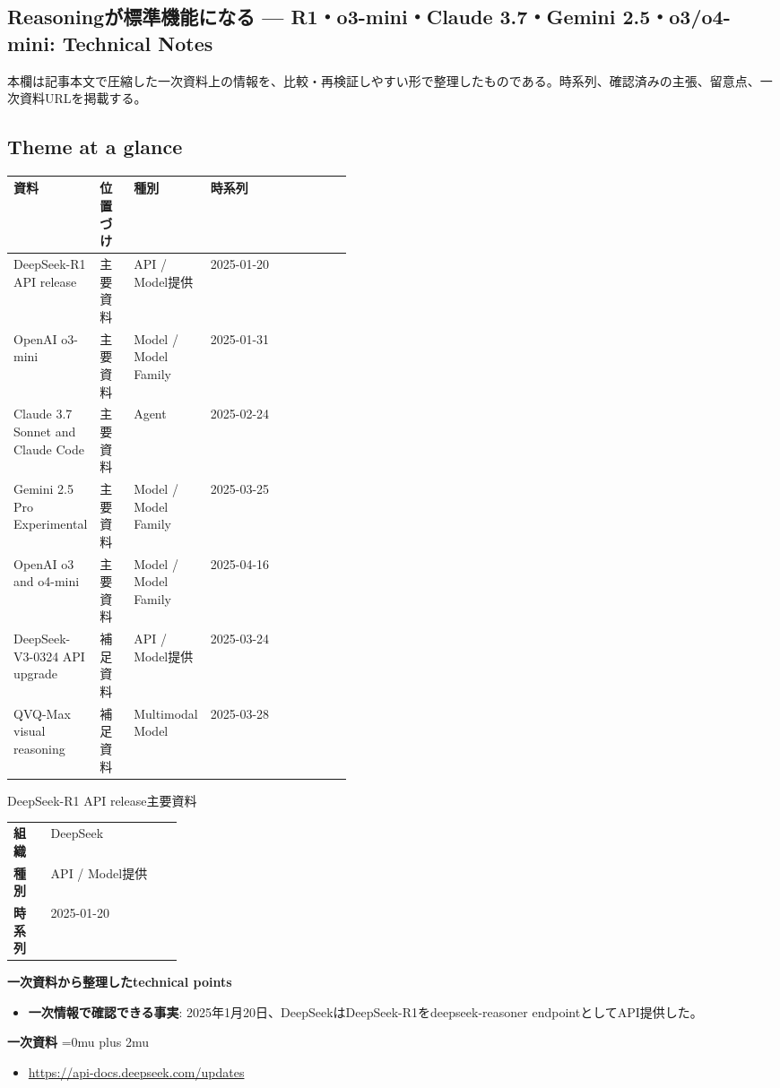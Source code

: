 \subsection*{Reasoningが標準機能になる — R1・o3-mini・Claude 3.7・Gemini 2.5・o3/o4-mini: Technical Notes}
本欄は記事本文で圧縮した一次資料上の情報を、比較・再検証しやすい形で整理したものである。時系列、確認済みの主張、留意点、一次資料URLを掲載する。
\medskip
\subsection*{Theme at a glance}
\begin{center}
\footnotesize
\begin{tabularx}{\linewidth}{@{}p{0.20\linewidth}p{0.10\linewidth}p{0.14\linewidth}X@{}}
\toprule
資料 & 位置づけ & 種別 & 時系列 \\
\midrule
DeepSeek-R1 API release & 主要資料 & API / Model提供 & 2025-01-20 \\
OpenAI o3-mini & 主要資料 & Model / Model Family & 2025-01-31 \\
Claude 3.7 Sonnet and Claude Code & 主要資料 & Agent & 2025-02-24 \\
Gemini 2.5 Pro Experimental & 主要資料 & Model / Model Family & 2025-03-25 \\
OpenAI o3 and o4-mini & 主要資料 & Model / Model Family & 2025-04-16 \\
DeepSeek-V3-0324 API upgrade & 補足資料 & API / Model提供 & 2025-03-24 \\
QVQ-Max visual reasoning & 補足資料 & Multimodal Model & 2025-03-28 \\
\bottomrule
\end{tabularx}
\end{center}
\normalsize

\begin{technicalnote}{DeepSeek-R1 API release}{主要資料}
\begingroup
\begin{tabularx}{\linewidth}{@{}>{\bfseries}p{0.22\linewidth}X@{}}
組織 & DeepSeek \\
種別 & API / Model提供 \\
時系列 & 2025-01-20 \\
\end{tabularx}
\smallskip
{\bfseries 一次資料から整理したtechnical points}
\begin{itemize}[leftmargin=1.5em,itemsep=0.35em]
\item \textbf{一次情報で確認できる事実}: 2025年1月20日、DeepSeekはDeepSeek-R1をdeepseek-reasoner endpointとしてAPI提供した。
\end{itemize}
\begin{samepage}
{\bfseries 一次資料}
\begingroup\sloppy
\Urlmuskip=0mu plus 2mu\relax
\begin{itemize}[leftmargin=1.5em,itemsep=0.25em]
\item {\scriptsize\url{https://api-docs.deepseek.com/updates}}
\end{itemize}
\endgroup
\end{samepage}
\endgroup
\end{technicalnote}
\medskip

